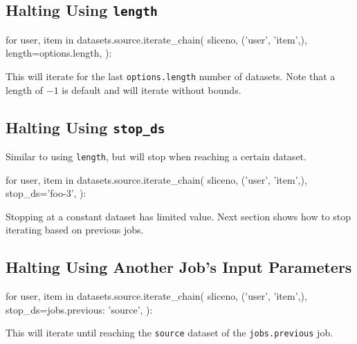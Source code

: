 \subsection{Halting Using \texttt{length}}
\begin{python}
for user, item in datasets.source.iterate_chain(
    sliceno,
    ('user', 'item',),
    length=options.length,
):
\end{python}
This will iterate for the last \texttt{options.length} number of
datasets.  Note that a length of $-1$ is default and will iterate
without bounds.


\subsection{Halting Using \texttt{stop\_ds}}
Similar to using \texttt{length}, but will stop when reaching a
certain dataset.
\begin{python}
for user, item in datasets.source.iterate_chain(
    sliceno,
    ('user', 'item',),
    stop_ds='foo-3',
):
\end{python}
Stopping at a constant dataset has limited value.  Next section shows
how to stop iterating based on previous jobs.



\subsection{Halting Using Another Job's Input Parameters}
\begin{python}
for user, item in datasets.source.iterate_chain(
    sliceno,
    ('user', 'item',),
    stop_ds={jobs.previous: 'source'},
):
\end{python}
This will iterate until reaching the \texttt{source} dataset of
the \texttt{jobs.previous} job.



